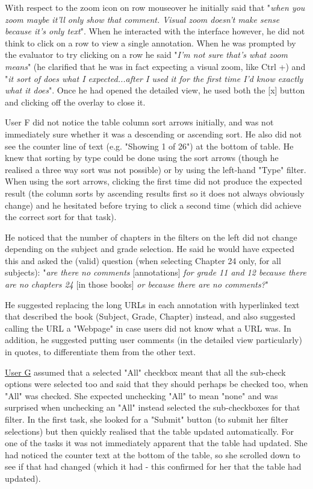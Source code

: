 With respect to the zoom icon on row mouseover he initially said that "\textit{when you zoom maybe it'll only show that comment. Visual zoom doesn't make sense because it's only text}". When he interacted with the interface however, he did not think to click on a row to view a single annotation.  When he was prompted by the evaluator to try clicking on a row he said "\textit{I'm not sure that's what zoom means}" (he clarified that he was in fact expecting a visual zoom, like Ctrl +) and "\textit{it sort of does what I expected...after I used it for the first time I'd know exactly what it does}". Once he had opened the detailed view, he used both the [x] button and clicking off the overlay to close it. 

User F did not notice the table column sort arrows initially, and was not immediately sure whether it was a descending or ascending sort. He also did not see the counter line of text (e.g. "Showing 1 of 26") at the bottom of table. He knew that sorting by type could be done using the sort arrows (though he realised a three way sort was not possible) or by using the left-hand "Type" filter. When using the sort arrows, clicking the first time did not produce the expected result (the column sorts by ascending results first so it does not always obviously change) and he hesitated before trying to click a second time (which did achieve the correct sort for that task).

He noticed that the number of chapters in the filters on the left did not change depending on the subject and grade selection. He said he would have expected this and asked the (valid) question (when selecting Chapter 24 only, for all subjects):  "\textit{are there no comments} [annotations] \textit{for grade 11 and 12 because there are no chapters 24} [in those books] \textit{or because there are no comments?}"

He suggested replacing the long URLs in each annotation with hyperlinked text that described the book (Subject, Grade, Chapter) instead, and also suggested calling the URL a "Webpage" in case users did not know what a URL was. In addition, he suggested putting user comments (in the detailed view particularly) in quotes, to differentiate them from the other text.  

\underline{User G} assumed that a selected "All" checkbox meant that all the sub-check options were selected too and said that they should perhaps be checked too, when "All" was checked.  She expected unchecking "All" to mean "none" and was surprised when unchecking an "All" instead selected the sub-checkboxes for that filter. In the first task, she looked for a "Submit" button (to submit her filter selections) but then quickly realised that the table updated automatically. For one of the tasks it was not immediately apparent that the table had updated. She had noticed the counter text at the bottom of the table, so she scrolled down to see if that had changed (which it had - this confirmed for her that the table had updated). 

